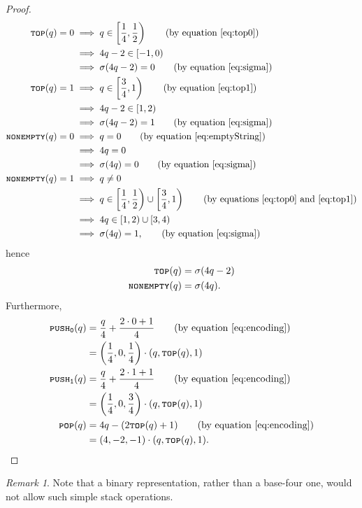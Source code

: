 \documentclass{book}
\newcommand{\pushone}{\texttt{\textsc{push}}\textsubscript{\texttt{1}}}
\newcommand{\pushzero}{\texttt{\textsc{push}}\textsubscript{\texttt{0}}}
\newcommand{\nonempty}{\textsc{\texttt{nonempty}}}
\newcommand{\tos}{\textsc{\texttt{top}}}
\newcommand{\pop}{\textsc{\texttt{pop}}}
\theoremstyle{definition}
\theoremstyle{plain}
\theoremstyle{plain}
\theoremstyle{remark}
\newtheorem{remark}{Remark}[theorem]
\theoremstyle{plain}
\begin{document}
	\begin{proof}
		\begin{align*}
			\tos(q)=0 	   &\implies q\in\left[\frac{1}{4},\frac{1}{2}\right) \tag{by equation \ref{eq:top0}} \\
						   &\implies 4q-2\in[-1,0) \\
						   &\implies \sigma(4q-2)=0 \tag{by equation \ref{eq:sigma}} \\
			\tos(q)=1 	   &\implies q\in\left[\frac{3}{4},1\right) \tag{by equation \ref{eq:top1}} \\
						   &\implies 4q-2\in[1,2) \\
						   &\implies \sigma(4q-2)=1 \tag{by equation \ref{eq:sigma}} \\
			\nonempty(q)=0 &\implies q=0 \tag{by equation \ref{eq:emptyString}} \\
						   &\implies 4q=0 \\
						   &\implies \sigma(4q)=0 \tag{by equation \ref{eq:sigma}} \\
			\nonempty(q)=1 &\implies q\neq 0 \\
						   &\implies q\in\left[\frac{1}{4},\frac{1}{2}\right)\cup\left[\frac{3}{4},1\right) \tag{by equations \ref{eq:top0} and \ref{eq:top1}} \\
						   &\implies 4q\in[1,2)\cup[3,4) \\
						   &\implies \sigma(4q)=1, \tag{by equation \ref{eq:sigma}} 
		\end{align*}
		hence
		\begin{align*}
			\tos(q) 	 &= \sigma(4q-2) \\
			\nonempty(q) &= \sigma(4q).
		\end{align*}
		Furthermore,
		\begin{align*}
			\pushzero(q)   &= \frac{q}{4}+\frac{2\cdot 0+1}{4} \tag{by equation \ref{eq:encoding}}\\ 
						   &= \left(\frac{1}{4},0,\frac{1}{4}\right)\cdot(q,\textsc{\texttt{top}}(q),1) \\
			\pushone(q)    &= \frac{q}{4}+\frac{2\cdot 1+1}{4} \tag{by equation \ref{eq:encoding}} \\ 
						   &= \left(\frac{1}{4},0,\frac{3}{4}\right)\cdot(q,\textsc{\texttt{top}}(q),1) \\
			\pop(q)        &= 4q-(2\tos(q)+1) \tag{by equation \ref{eq:encoding}} \\
						   &= (4,-2,-1)\cdot(q,\tos(q),1).
		\end{align*}
	\end{proof}
	\begin{remark}
		Note that a binary representation, rather than a base-four one, would not allow such simple stack operations.
	\end{remark}
	
\end{document}
